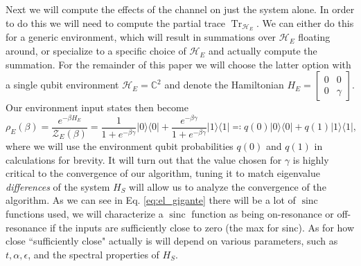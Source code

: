 \documentclass{article}
\newcommand{\ketbra}[2]{| #1\rangle\! \langle #2|}
\DeclareMathOperator{\Tr}{Tr}
\newcommand{\hilb}{\mathcal{H}}
\newcommand{\partfun}{\mathcal{Z}}
\DeclareMathOperator{\sinc}{sinc}
\begin{document}
Next we will compute the effects of the channel on just the system alone. In order to do this we will need to compute the partial trace $\Tr_{\hilb_E}$. We can either do this for a generic environment, which will result in summations over $\hilb_E$ floating around, or specialize to a specific choice of $\hilb_E$ and actually compute the summation. For the remainder of this paper we will choose the latter option with a single qubit environment $\hilb_E = \mathbb{C}^2$ and denote the Hamiltonian $H_E = \begin{bmatrix} 0 & 0 \\ 0 & \gamma \end{bmatrix}$. Our environment input states then become
\begin{equation}
    \rho_E(\beta) = \frac{e^{-\beta H_E}}{\partfun_E(\beta)} = \frac{1}{1 + e^{-\beta \gamma}} \ketbra{0}{0} + \frac{e^{-\beta \gamma}}{1 + e^{-\beta \gamma}} \ketbra{1}{1} \eqqcolon q(0) \ketbra{0}{0} + q(1) \ketbra{1}{1} \label{eq:env_state_def},
\end{equation}
where we will use the environment qubit probabilities $q(0)$ and $q(1)$ in calculations for brevity. It will turn out that the value chosen for $\gamma$ is highly critical to the convergence of our algorithm, tuning it to match eigenvalue \emph{differences} of the system $H_S$ will allow us to analyze the convergence of the algorithm. As we can see in Eq. \eqref{eq:el_gigante} there will be a lot of $\sinc$ functions used, we will characterize a $\sinc$ function as being on-resonance or off-resonance if the inputs are sufficiently close to zero (the max for sinc). As for how close ``sufficiently close" actually is will depend on various parameters, such as $t, \alpha, \epsilon$, and the spectral properties of $H_S$.  
\end{document}
